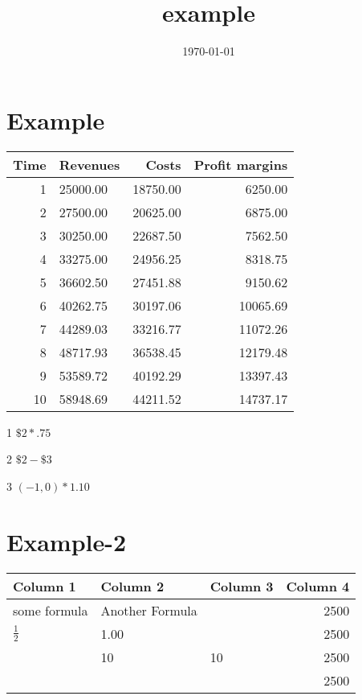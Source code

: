 \documentclass[11pt]{article}
\date{\today}
\title{example}
\begin{document}
\maketitle
\tableofcontents

\section{Example}
\label{sec-1}


\begin{table}
\centering
\begin{threeparttable}

\begin{tabular}{rlrr}
Time & Revenues & Costs\tnote{1} & Profit margins\tnote{2}\\
\hline
1 & 25000.00 & 18750.00 & 6250.00\\
2 & 27500.00\tnote{3} & 20625.00 & 6875.00\\
3 & 30250.00\tnote{3} & 22687.50 & 7562.50\\
4 & 33275.00\tnote{3} & 24956.25 & 8318.75\\
5 & 36602.50\tnote{3} & 27451.88 & 9150.62\\
6 & 40262.75\tnote{3} & 30197.06 & 10065.69\\
7 & 44289.03\tnote{3} & 33216.77 & 11072.26\\
8 & 48717.93\tnote{3} & 36538.45 & 12179.48\\
9 & 53589.72\tnote{3} & 40192.29 & 13397.43\\
10 & 58948.69\tnote{3} & 44211.52 & 14737.17\\
\hline
\end{tabular}

\begin{tablenotes}
\item [1] \(\$2*.75\)
\item [2] \(\$2-\$3\)
\item [3] \((-1,0)*1.10\)
\end{tablenotes}

\end{threeparttable}
\end{table}

\section{Example-2}
\label{sec-2}
\begin{tabular}{lllr}
Column 1 & Column 2 & Column 3 & Column 4\footnotemark\\
\hline
some formula & Another Formula &  & 2500\\
\(\frac{1}{2}\)\footnotemark & 1.00\footnotemark &  & 2500\\
 & 10\footnotemark & 10\footnotemark[4]{} & 2500\\
 &  &  & 2500\\
\end{tabular}
\end{document}
